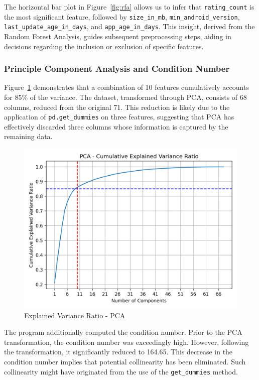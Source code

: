 The horizontal bar plot in Figure~\ref{fig:rfa} allows us to infer that \texttt{rating\_count} is the most significant feature, followed by \texttt{size\_in\_mb}, \texttt{min\_android\_version}, \texttt{last\_update\_age\_in\_days}, and \texttt{app\_age\_in\_days}. This insight, derived from the Random Forest Analysis, guides subsequent preprocessing steps, aiding in decisions regarding the inclusion or exclusion of specific features.

\subsubsection{Principle Component Analysis and Condition Number}
Figure~\ref{fig:pca} demonstrates that a combination of 10 features cumulatively accounts for 85\% of the variance. The dataset, transformed through PCA, consists of 68 columns, reduced from the original 71. This reduction is likely due to the application of \texttt{pd.get\_dummies} on three features, suggesting that PCA has effectively discarded three columns whose information is captured by the remaining data.

\begin{figure}[h]
    \centering
    \includegraphics[width=\textwidth]{docs//assets/pca.png}
    \caption{Explained Variance Ratio - PCA}
    \label{fig:pca}
\end{figure}

The program additionally computed the condition number. Prior to the PCA transformation, the condition number was exceedingly high. However, following the transformation, it significantly reduced to 164.65. This decrease in the condition number implies that potential collinearity has been eliminated. Such collinearity might have originated from the use of the \texttt{get\_dummies} method.


